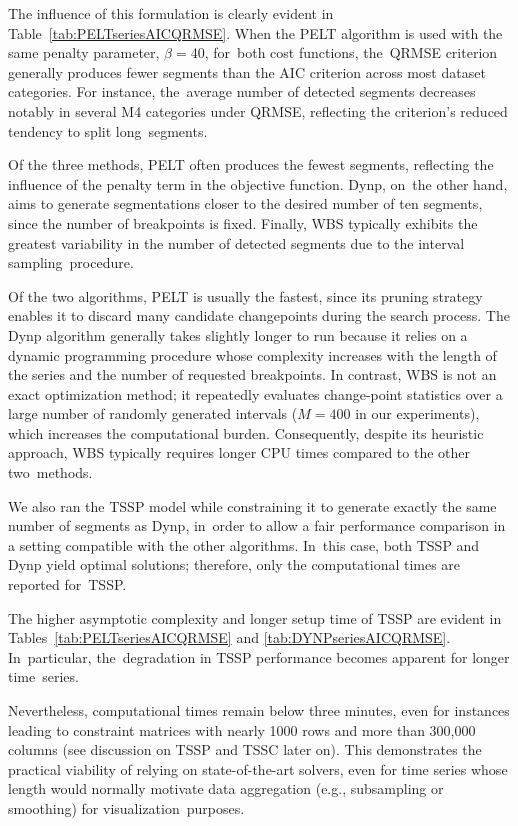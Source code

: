 \documentclass[mathematics,article,accept,pdftex,moreauthors]{Definitions/mdpi}
\begin{document}
The influence of this formulation is clearly evident in Table~\ref{tab:PELTseriesAICQRMSE}. When the PELT algorithm is used with the same penalty parameter, $\beta = 40$, for~both cost functions, the~QRMSE criterion generally produces fewer segments than the AIC criterion across most dataset categories. 
For instance, the~average number of detected segments decreases notably in several M4 categories under QRMSE, reflecting the criterion's reduced tendency to split long~segments.

Of the three methods, PELT often produces the fewest segments, reflecting the influence of the penalty term in the objective function. 
Dynp, on~the other hand, aims to generate segmentations closer to the desired number of ten segments, since the number of breakpoints is fixed. Finally, WBS typically exhibits the greatest variability in the number of detected segments due to the interval sampling~procedure. 

Of the two algorithms, PELT is usually the fastest, since its pruning strategy enables it to discard many candidate changepoints during the search process.
The Dynp algorithm generally takes slightly longer to run because it relies on a dynamic programming procedure whose complexity increases with the length of the series and the number of requested breakpoints. 
In contrast, WBS is not an exact optimization method; it repeatedly evaluates change-point statistics over a large number of randomly generated intervals ($M = 400$ in our experiments), which increases the computational burden. 
Consequently, despite its heuristic approach, WBS typically requires longer CPU times compared to the other two~methods.

We also ran the TSSP model while constraining it to generate exactly the same number of segments as Dynp, in~order to allow a fair performance comparison in a setting compatible with the other algorithms. In~this case, both TSSP and Dynp yield optimal solutions; therefore, only the computational times are reported for~TSSP.

The higher asymptotic complexity and longer setup time of TSSP are evident in Tables~\ref{tab:PELTseriesAICQRMSE} and \ref{tab:DYNPseriesAICQRMSE}. In~particular, the~degradation in TSSP performance becomes apparent for longer time~series.

Nevertheless, computational times remain below three minutes, even for instances leading to constraint matrices with nearly 1000 rows and more than 300,000 columns (see discussion on TSSP and TSSC later on). This demonstrates the practical viability of relying on state-of-the-art solvers, even for time series whose length would normally motivate data aggregation (e.g., subsampling or smoothing) for visualization~purposes.
\end{document}
